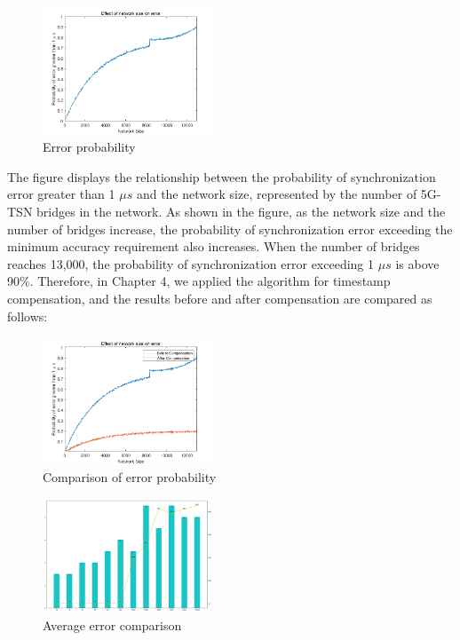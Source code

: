 \documentclass[english]{cccconf}
\begin{document}
\begin{figure}[htbp]
	\centering
	\setcounter{figure}{6}
	\includegraphics[width=2in]{fig18.png}
	\caption{Error probability}
\end{figure}
The figure displays the relationship between the probability of synchronization error greater than 1 $\mu s$ and the network size, represented by the number of 5G-TSN bridges in the network. As shown in the figure, as the network size and the number of bridges increase, the probability of synchronization error exceeding the minimum accuracy requirement also increases. When the number of bridges reaches 13,000, the probability of synchronization error exceeding 1 $\mu s$ is above 90\%. Therefore, in Chapter 4, we applied the algorithm for timestamp compensation, and the results before and after compensation are compared as follows:
\begin{figure}[htbp]
	\centering
	\setcounter{figure}{6}
	\includegraphics[width=2in]{fig20.png}
	\caption{Comparison of error probability }
\end{figure}
\begin{figure}[htbp]
	\centering
	\setcounter{figure}{7}
	\includegraphics[width=2in]{fig19.png}
	\caption{Average error comparison}
\end{figure}
\end{document}
